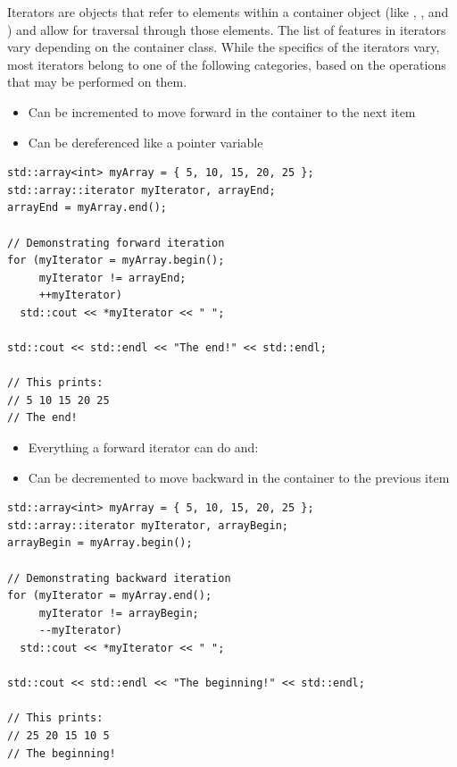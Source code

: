 Iterators are objects that refer to elements within a container object (like , , and ) and allow for traversal through those elements. 
The list of features in iterators vary depending on the container class. 
While the specifics of the iterators vary, most iterators belong to one of the following categories, based on the operations that may be performed on them.


\begin{itemize}
	\item Can be incremented to move forward in the container to the next item
	\item Can be dereferenced like a pointer variable
\end{itemize}

\noindent\begin{minipage}{\linewidth}\begin{lstlisting}
std::array<int> myArray = { 5, 10, 15, 20, 25 };
std::array::iterator myIterator, arrayEnd;
arrayEnd = myArray.end();

// Demonstrating forward iteration
for (myIterator = myArray.begin(); 
     myIterator != arrayEnd; 
     ++myIterator)
  std::cout << *myIterator << " ";

std::cout << std::endl << "The end!" << std::endl;

// This prints:
// 5 10 15 20 25
// The end!
\end{lstlisting}\end{minipage}


\begin{itemize}
	\item Everything a forward iterator can do and:
	\item Can be decremented to move backward in the container to the previous item
\end{itemize}

\noindent\begin{minipage}{\linewidth}\begin{lstlisting}
std::array<int> myArray = { 5, 10, 15, 20, 25 };
std::array::iterator myIterator, arrayBegin;
arrayBegin = myArray.begin();

// Demonstrating backward iteration
for (myIterator = myArray.end(); 
     myIterator != arrayBegin; 
     --myIterator)
  std::cout << *myIterator << " ";

std::cout << std::endl << "The beginning!" << std::endl;

// This prints:
// 25 20 15 10 5
// The beginning!
\end{lstlisting}\end{minipage}

